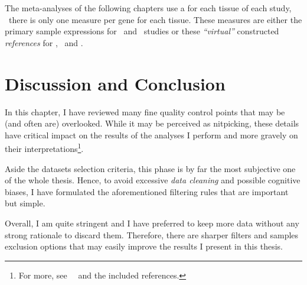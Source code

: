 \begin{itemize}[topsep=0pt,nosep]
\end{itemize}

The meta-analyses of the following chapters use
a  for each tissue of each study, \ie\
there is only one measure per gene for each tissue.
These measures\label{def:trep} are either
the primary sample expressions for \castle\ and \ibm\ studies or
these \emph{\enquote{virtual}} constructed \emph{references}
for \brawand, \uhlen\ and \gtex.



\section{Discussion and Conclusion}

In this chapter, I have reviewed many fine quality control points that
may be (and often are) overlooked.
While it may be perceived as nitpicking,
these details have critical impact on the results of the analyses
I perform and more gravely on their interpretations\footnote{%
For more, see~~
and the included references.}.

Aside the datasets selection criteria,
this phase is by far the most subjective one of the whole thesis.
Hence, to avoid excessive \emph{data cleaning}
and possible cognitive biases,
I have formulated the aforementioned filtering rules
that are important but simple.

Overall, I am quite stringent and I have preferred to keep more data
without any strong rationale to discard them.
Therefore, there are sharper filters and samples exclusion options that
may easily improve the results I present in this thesis.


